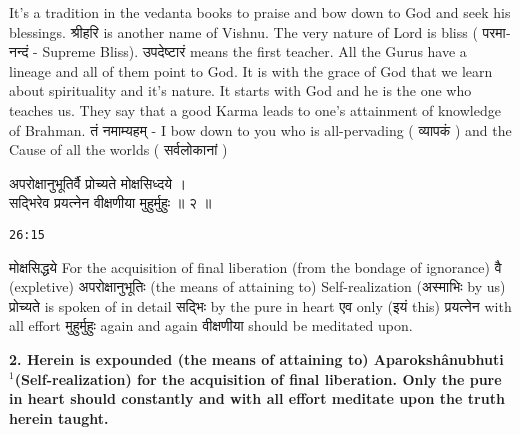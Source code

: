 \documentclass{article}
\begin{document}
\begin{oframed}
It's a tradition in the vedanta books to praise and bow down to God and
seek his blessings.
\texthindi{श्रीहरि}
is another name of Vishnu. The very nature of Lord is bliss (
\texthindi{परमानन्दं}
- Supreme Bliss).
\texthindi{उपदेष्टारं}
 means the first teacher. All the Gurus have a lineage and all of them point to
God. It is with the grace of God that we learn about spirituality and it's
nature. It starts with God and he is the one who teaches us. They say that a
good Karma leads to one's attainment of knowledge of Brahman.
\texthindi{तं नमाम्यहम्}
- I bow down to you who is all-pervading (
\texthindi{व्यापकं}
) 
 and the Cause of all the worlds (
\texthindi{सर्वलोकानां}
)
\end{oframed}
 
\bigskip

\begin{large}
\begin{center}
    \begin{hindi}
	अपरोक्षानुभूतिर्वै प्रोच्यते मोक्षसिध्दये ।\\
	सद्भिरेव प्रयत्नेन वीक्षणीया मुहुर्मुहुः ॥ २ ॥
    \end{hindi}
\end{center}
\end{large}
\texttt{26:15}

\texthindi{मोक्षसिद्धये}
For the acquisition of final liberation (from the bondage of ignorance)
\texthindi{वै}
(expletive)
\texthindi{अपरोक्षानुभूतिः}
(the means of attaining to) Self-realization
(\texthindi{अस्माभिः}
by us)
\texthindi{प्रोच्यते}
is spoken of in detail
\texthindi{सद्भिः}
by the pure in heart
\texthindi{एव}
only
(\texthindi{इयं}
this)
\texthindi{प्रयत्नेन}
with all effort
\texthindi{मुहुर्मुहुः}
again and again
\texthindi{वीक्षणीया}
should be meditated upon.

\bigskip

\textbf{ 2. Herein is expounded (the means of attaining to) Aparokshânubhuti
$^1$(Self-realization) for the acquisition of final liberation.  Only the pure
in heart should constantly and with all effort meditate upon the truth herein
taught.  }
\end{document}
